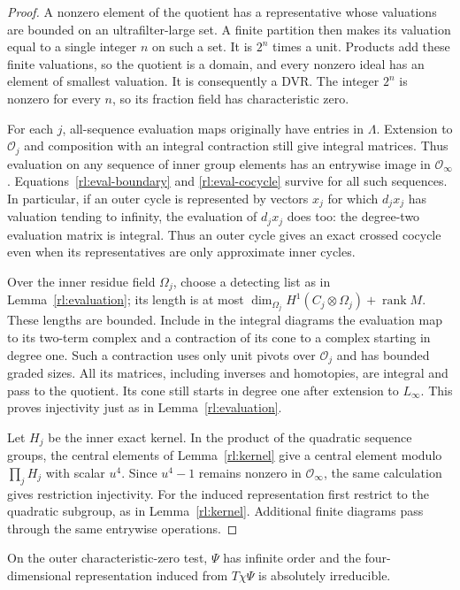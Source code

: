 \begin{proof}
A nonzero element of the quotient has a representative whose
valuations are bounded on an ultrafilter-large set.  A finite
partition then makes its valuation equal to a single integer $n$
on such a set.  It is $2^n$ times a unit.  Products add these finite
valuations, so the quotient is a domain, and every nonzero ideal has
an element of smallest valuation.  It is consequently a DVR.  The
integer $2^n$ is nonzero for every $n$, so its fraction field has
characteristic zero.

For each $j$, all-sequence evaluation maps originally have entries
in $\Lambda$.  Extension to $\mathcal O_j$ and composition with an
integral contraction still give integral matrices.  Thus evaluation
on any sequence of inner group elements has an entrywise image in
$\mathcal O_\infty$.  Equations~\eqref{rl:eval-boundary} and
\eqref{rl:eval-cocycle} survive for all such sequences.  In particular,
if an outer cycle is represented by vectors $x_j$ for which
$d_jx_j$ has valuation tending to infinity, the evaluation of
$d_jx_j$ does too: the degree-two evaluation matrix is integral.
Thus an outer cycle gives an exact crossed cocycle even when its
representatives are only approximate inner cycles.

Over the inner residue field $\Omega_j$, choose a detecting list as
in Lemma~\ref{rl:evaluation}; its length is at most
$\dim_{\Omega_j}H^1(C_j\otimes\Omega_j)+\operatorname{rank}M$.
These lengths are bounded.  Include in the integral diagrams the
evaluation map to its two-term complex and a contraction of its cone
to a complex starting in degree one.  Such a contraction uses only
unit pivots over $\mathcal O_j$ and has bounded graded sizes.
All its matrices, including inverses and homotopies, are integral
and pass to the quotient.  Its cone still starts in degree one
after extension to $L_\infty$.  This proves injectivity just as in
Lemma~\ref{rl:evaluation}.

Let $H_j$ be the inner exact kernel. In the product of the quadratic
sequence groups, the central elements of Lemma~\ref{rl:kernel} give
a central element modulo $\prod_jH_j$ with scalar $u^4$. Since
$u^4-1$ remains nonzero in $\mathcal O_\infty$, the same calculation
gives restriction injectivity. For the induced representation first
restrict to the quadratic subgroup, as in Lemma~\ref{rl:kernel}.
Additional finite diagrams pass through the same entrywise operations.
\end{proof}

\begin{lemma}
\label{rl:outer-irreducibility}
On the outer characteristic-zero test, $\Psi$ has infinite order and
the four-dimensional representation induced from $T\chi\Psi$ is
absolutely irreducible.
\end{lemma}

